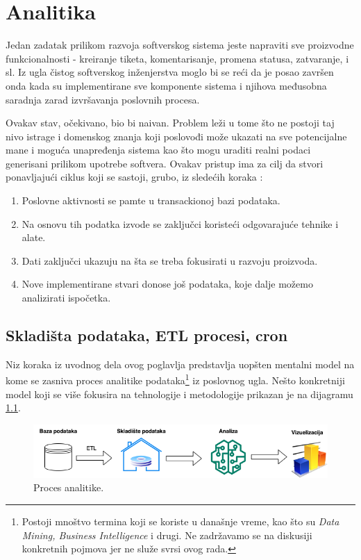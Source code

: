 \documentclass[12pt,oneside]{memoir}
\begin{document}
\chapter{Analitika}

Jedan zadatak prilikom razvoja softverskog sistema jeste napraviti sve proizvodne funkcionalnosti - kreiranje tiketa, komentarisanje, promena statusa, zatvaranje, i sl. Iz ugla čistog softverskog inženjerstva moglo bi se reći da je posao završen onda kada su implementirane sve komponente sistema i njihova međusobna saradnja zarad izvršavanja poslovnih procesa.

Ovakav stav, očekivano, bio bi naivan. Problem leži u tome što ne postoji taj nivo istrage i domenskog znanja koji poslovođi može ukazati na sve potencijalne mane i moguća unapređenja sistema kao što mogu uraditi realni podaci generisani prilikom upotrebe softvera. Ovakav pristup ima za cilj da stvori ponavljajući ciklus koji se sastoji, grubo, iz sledećih koraka \cite{dataanalytics}:
\begin{enumerate}
    \item Poslovne aktivnosti se pamte u transackionoj bazi podataka.
    \item Na osnovu tih podatka izvode se zaključci koristeći odgovarajuće tehnike i alate.
    \item Dati zaključci ukazuju na šta se treba fokusirati u razvoju proizvoda.
    \item Nove implementirane stvari donose još podataka, koje dalje možemo analizirati ispočetka.
\end{enumerate}

\section{Skladišta podataka, ETL procesi, cron}

Niz koraka iz uvodnog dela ovog poglavlja predstavlja uopšten mentalni model na kome se zasniva proces analitike podataka\footnote{Postoji mnoštvo termina koji se koriste u današnje vreme, kao što su \textit{Data Mining, Business Intelligence} i drugi. Ne zadržavamo se na diskusiji konkretnih pojmova jer ne služe svrsi ovog rada.} iz poslovnog ugla. Nešto konkretniji model koji se više fokusira na tehnologije i metodologije prikazan je na dijagramu \ref{fig:datadiag}.

\begin{figure}[h]
  \centering
  \includegraphics[width=1\textwidth]{docs/images/ch_5/datadiag.png} 
  \caption{Proces analitike.}
  \label{fig:datadiag}
\end{figure}
\end{document}
